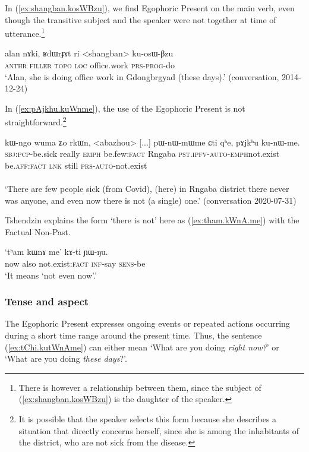 In (\ref{ex:shangban.kosWBzu}), we find Egophoric Present on the main verb, even though the transitive subject and the speaker were not together at time of utterance.\footnote{There is however a relationship between them, since the subject of (\ref{ex:shangban.kosWBzu}) is the daughter of the speaker. }


\begin{exe}
	\ex \label{ex:shangban.kosWBzu}
	\gll alan nɤki, ʁdɯrɟɤt ri <shangban> ku-osɯ-βzu \\
	\textsc{anthr} \textsc{filler}  \textsc{topo} \textsc{loc} office.work \textsc{prs}-\textsc{prog}-do \\
	\glt `Alan, she is doing office work in Gdongbrgyad (these days).' (conversation, 2014-12-24)
\end{exe}

In (\ref{ex:pAjkhu.kuWnme}), the use of the Egophoric Present is not straightforward.\footnote{It is possible that the speaker selects this form because she describes a situation that directly concerns herself, since she is among the inhabitants of the district, who are not sick from the disease. }

\begin{exe}
	\ex \label{ex:pAjkhu.kuWnme}
	\gll kɯ-ngo wuma ʑo rkɯn, <abazhou> [...] pɯ-nɯ-mɯ\redp{}me ɕti qʰe, pɤjkʰu ku-nɯ-me. \\
	\textsc{sbj}:\textsc{pcp}-be.sick really \textsc{emph} be.few:\textsc{fact} Rngaba {  } \textsc{pst}.\textsc{ipfv}-\textsc{auto}-\textsc{emph}\redp{}not.exist be.\textsc{aff}:\textsc{fact} \textsc{lnk} still \textsc{prs}-\textsc{auto}-not.exist \\
	\\
	\glt `There are few people sick (from Covid), (here) in Rngaba district there never was anyone, and even now there is not (a single) one.' 	(conversation 2020-07-31)
\end{exe}

Tshendzin explains the form  `there is not' here as (\ref{ex:tham.kWnA.me}) with the Factual Non-Past.
 
\begin{exe}
	\ex \label{ex:tham.kWnA.me}
	\gll `tʰam kɯnɤ me' kɤ-ti ɲɯ-ŋu. \\
	now also not.exist:\textsc{fact} \textsc{inf}-say \textsc{sens}-be \\
	\glt `It means `not even now'.'
\end{exe}


\subsubsection{Tense and aspect} \label{sec:egophoric.tense}
The Egophoric Present expresses ongoing events or repeated actions occurring during a short time range around the present time. Thus, the sentence (\ref{ex:tChi.kutWnAme}) can either mean `What are you doing \textit{right now?}' or `What are you doing \textit{these days}?'.

